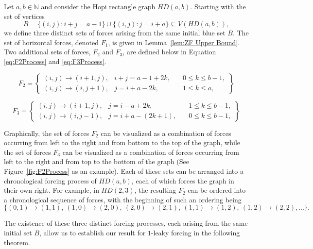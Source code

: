 \documentclass[11pt]{article}
\theoremstyle{plain} \newtheorem{question}{Question}
\theoremstyle{definition}
\begin{document}
Let $a,b \in \mathbb{N}$ and consider the Hopi rectangle graph $HD(a,b)$. 
Starting with the set of vertices 
\[
B=\{(i,j): i+j=a-1\}\cup\{(i,j): j=i+a\} \subseteq V(HD(a,b)),
\]
we define three distinct sets of forces arising from the same initial blue set $B$. 
The set of horizontal forces, denoted $F_1$, is given in Lemma~\ref{lem:ZF Upper Bound}. 
Two additional sets of forces, $F_2$ and $F_3$, are defined below in Equation \ref{eq:F2Process} and \ref{eq:F3Process}. 
\vspace{-.2in}
\begin{center}
\begin{equation}\label{eq:F2Process}
    F_{2} = \left\{
\begin{array}{lll}
(i,j)\rightarrow(i+1,j), & i + j = a - 1 + 2k,\quad & 0 \leq k \leq b-1, \\[6pt]
(i,j)\rightarrow(i,j+1), & j = i + a - 2k,\quad & 1 \leq k \leq a,
\end{array}
\right\}
\end{equation}
\end{center}

\begin{center}
\begin{equation}\label{eq:F3Process}
    F_{3} = \left\{
\begin{array}{lll}
(i,j)\rightarrow(i+1,j), & j = i - a + 2k,\quad & 1 \leq k \leq b-1, \\[6pt]
(i,j)\rightarrow(i,j-1), & j = i + a - (2k+1),\quad & 0 \leq k \leq b-1,
\end{array}
\right\}
\end{equation}
\end{center}

Graphically, the set of forces $F_2$ can be visualized as a combination of forces occurring from left to the right and from bottom to the top of the graph, while the set of forces $F_3$ can be visualized as a combination of forces occurring from left to the right and from top to the bottom of the graph (See Figure~\ref{fig:F2Process} as an example). Each of these sets can be arranged into a chronological forcing process of $HD(a,b)$, each of which forces the graph in their own right. For example, in $HD(2,3)$, the resulting $F_2$ can be ordered into a chronological sequence of forces, with the beginning of such an ordering being
\[ 
 \{(0,1)\to(1,1),\ (1,0)\to(2,0),\ (2,0)\to(2,1),\ (1,1)\to(1,2),\ (1,2)\to(2,2), \ldots\}.
\]




The existence of these three distinct forcing processes, each arising from the same initial set $B$, allow us to establish our result for $1$-leaky forcing in the following theorem.
\end{document}
